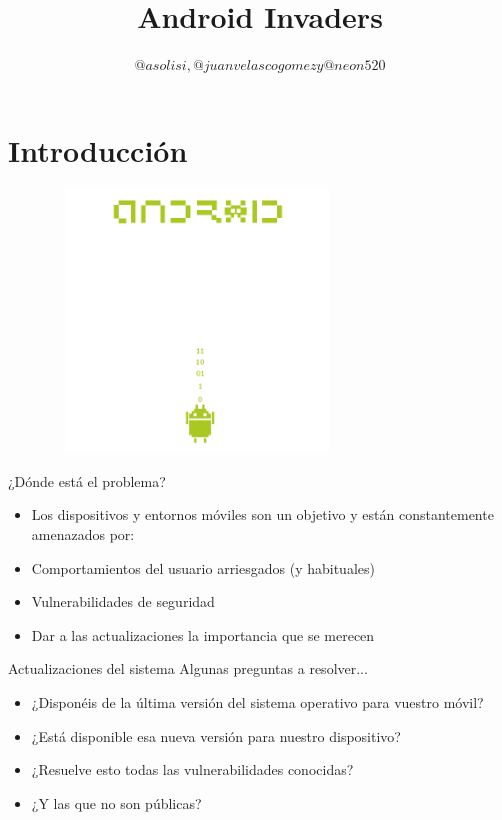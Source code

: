 \documentclass{beamer}
\title[Charla Android]{Android Invaders}
\author[LPB]{$@asolisi, @juanvelascogomez y @neon520$}
\institute[UGR]{Universidad de Granada}
\begin{document}
\maketitle

\section*{Introducción}
\begin{frame}
{
	\includegraphics[width=10cm, height=7cm]{androidInvaders_nobackground.png}
}
\end{frame}

\begin{frame}{¿Dónde está el problema?}
	\begin{itemize}[<+-|alert@+>]
		
	\item Los dispositivos y entornos móviles son un objetivo y están constantemente amenazados por:
	\item Comportamientos del usuario arriesgados (y habituales)
	\item Vulnerabilidades de seguridad
	\item Dar a las actualizaciones la importancia que se merecen
	
	\end{itemize}
\end{frame}

\begin{frame}{Actualizaciones del sistema}
	Algunas preguntas a resolver...
	
\begin{itemize}[<+-|alert@+>]
	
	\item ¿Disponéis de la última versión del sistema operativo para vuestro móvil?
	\item ¿Está disponible esa nueva versión para nuestro dispositivo?
	\item ¿Resuelve esto todas las vulnerabilidades conocidas?
	\item ¿Y las que no son públicas?
	
\end{itemize}
\end{frame}
\end{document}
